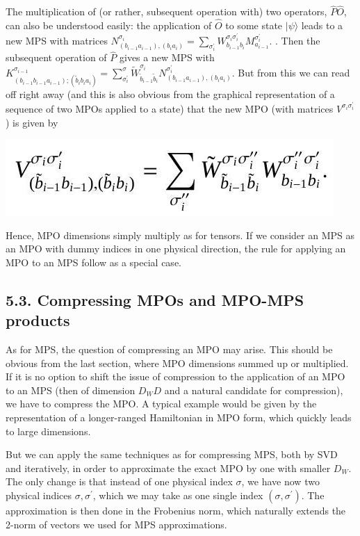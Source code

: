 \documentclass[12pt]{article}
\begin{document}
The multiplication of (or rather, subsequent operation with) two operators, $\hat{P} \hat{O}$, can also be understood easily: the application of $\hat{O}$ to some state $|\psi\rangle$ leads to a new MPS with matrices $N_{\left(b_{i-1} a_{i-1}\right),\left(b_{i} a_{i}\right)}^{\sigma_{i}}=\sum_{\sigma_{i}^{\prime}} W_{b_{i-1} b_{i}}^{\sigma_{i} \sigma_{i}^{\prime}} M_{a_{i-1}}^{\sigma_{i}^{\prime}}$. . Then the subsequent operation of $\hat{P}$ gives a new MPS with $K_{\left(b_{i-1} b_{i-1} a_{i-1}\right) ;\left(\tilde{b}_{i} b_{i} a_{i}\right)}^{\sigma_{i-1}}=\sum_{\sigma_{i}^{\prime}}^{\sigma} \tilde{W}_{\tilde{b}_{i-1} \tilde{b}_{i}}^{\sigma_{i}} N_{\left(b_{i-1} a_{i-1}\right),\left(b_{i} a_{i}\right)}^{\sigma_{i}^{\prime}}$. But from this we can read off right away (and this is also obvious from the graphical representation of a sequence of two MPOs applied to a state) that the new MPO (with matrices $V^{\sigma_{i} \sigma_{i}^{\prime}}$ ) is given by

\begin{center}
\includegraphics[max width=\textwidth]{2024_05_04_afc4ad226da9ccfe0ac8g-058(1)}
\end{center}

Hence, MPO dimensions simply multiply as for tensors. If we consider an MPS as an MPO with dummy indices in one physical direction, the rule for applying an MPO to an MPS follow as a special case.

\subsection*{5.3. Compressing MPOs and MPO-MPS products}
As for MPS, the question of compressing an MPO may arise. This should be obvious from the last section, where MPO dimensions summed up or multiplied. If it is no option to shift the issue of compression to the application of an MPO to an MPS (then of dimension $D_{W} D$ and a natural candidate for compression), we have to compress the MPO. A typical example would be given by the representation of a longer-ranged Hamiltonian in MPO form, which quickly leads to large dimensions.

But we can apply the same techniques as for compressing MPS, both by SVD and iteratively, in order to approximate the exact MPO by one with smaller $D_{W}$. The only change is that instead of one physical index $\sigma$, we have now two physical indices $\sigma, \sigma^{\prime}$, which we may take as one single index $\left(\sigma, \sigma^{\prime}\right)$. The approximation is then done in the Frobenius norm, which naturally extends the 2-norm of vectors we used for MPS approximations.
\end{document}
